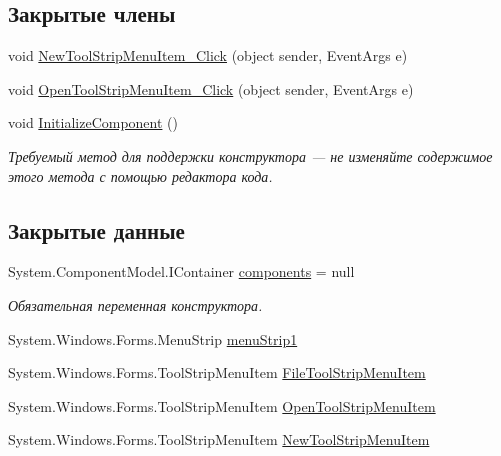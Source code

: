 \subsection*{Закрытые члены}
\begin{DoxyCompactItemize}
\item 
void \hyperlink{class_desktop_network_analyzator_1_1_main_form_af62e697612e1ecb886e7ad6ba1bb60a3}{New\+Tool\+Strip\+Menu\+Item\+\_\+\+Click} (object sender, Event\+Args e)
\item 
void \hyperlink{class_desktop_network_analyzator_1_1_main_form_a8cf989c632a4dc10eaaf1c1a97fdc600}{Open\+Tool\+Strip\+Menu\+Item\+\_\+\+Click} (object sender, Event\+Args e)
\item 
void \hyperlink{class_desktop_network_analyzator_1_1_main_form_aeb92516420e282cf27ace0ada2209461}{Initialize\+Component} ()
\begin{DoxyCompactList}\small\item\em Требуемый метод для поддержки конструктора — не изменяйте содержимое этого метода с помощью редактора кода. \end{DoxyCompactList}\end{DoxyCompactItemize}
\subsection*{Закрытые данные}
\begin{DoxyCompactItemize}
\item 
System.\+Component\+Model.\+I\+Container \hyperlink{class_desktop_network_analyzator_1_1_main_form_a89743a76f0c4531de267fc2213deea8a}{components} = null
\begin{DoxyCompactList}\small\item\em Обязательная переменная конструктора. \end{DoxyCompactList}\item 
System.\+Windows.\+Forms.\+Menu\+Strip \hyperlink{class_desktop_network_analyzator_1_1_main_form_a7fa592a22158b187ebfb71236adcc7ac}{menu\+Strip1}
\item 
System.\+Windows.\+Forms.\+Tool\+Strip\+Menu\+Item \hyperlink{class_desktop_network_analyzator_1_1_main_form_a605ff2f6848e2a4bed83d629b92c8de2}{File\+Tool\+Strip\+Menu\+Item}
\item 
System.\+Windows.\+Forms.\+Tool\+Strip\+Menu\+Item \hyperlink{class_desktop_network_analyzator_1_1_main_form_a4a9b853312eea96ef6ff4711d47e7b2a}{Open\+Tool\+Strip\+Menu\+Item}
\item 
System.\+Windows.\+Forms.\+Tool\+Strip\+Menu\+Item \hyperlink{class_desktop_network_analyzator_1_1_main_form_ae4b306685b46399668f12c7e1d8d6b23}{New\+Tool\+Strip\+Menu\+Item}
\end{DoxyCompactItemize}


